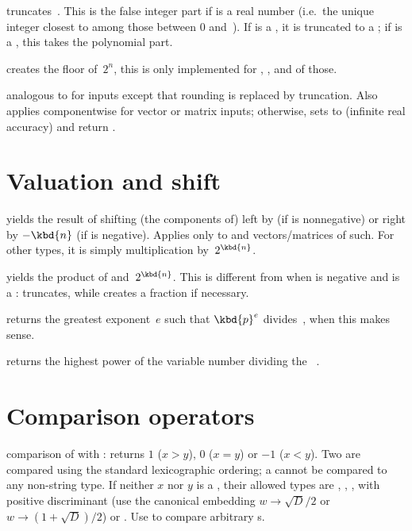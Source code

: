  truncates~. This is the false integer part
if  is a real number (i.e.~the unique integer closest to  among
those between 0 and~). If  is a , it is truncated
to a ; if  is a , this takes the polynomial part.

 creates the floor of~$2^n$, this is
only implemented for , ,  and  of
those.

 analogous to  for
 inputs except that rounding is replaced by truncation. Also applies
componentwise for vector or matrix inputs; otherwise, sets  to
 (infinite real accuracy) and return .

\section{Valuation and shift}

 yields the result of shifting
(the components of)  left by  (if  is nonnegative)
or right by $-\kbd{n}$ (if  is negative). Applies only to 
and vectors/matrices of such. For other types, it is simply multiplication
by~$2^{\kbd{n}}$.

 yields the product of 
and~$2^{\kbd{n}}$. This is different from  when  is negative
and  is a :  truncates, while 
creates a fraction if necessary.

 returns the greatest exponent~$e$ such that
$\kbd{p}^e$ divides~, when this makes sense.

 returns the highest power of the variable
number  dividing the ~.

\section{Comparison operators}


 comparison of  with : returns
$1$ ($x > y$), $0$ ($x = y$) or $-1$ ($x < y$). Two 
are compared using the standard lexicographic ordering; a 
cannot be compared to any non-string type. If neither
$x$ nor $y$ is a , their allowed types are , ,
,  with positive discriminant (use the canonical
embedding $w \to \sqrt{D}/2$ or $w \to (1 + \sqrt{D})/2$) or .
Use  to compare arbitrary s.

